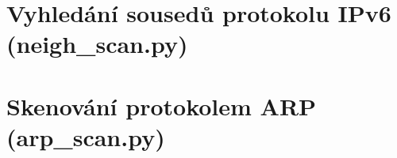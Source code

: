 \section*{Vyhledání sousedů protokolu IPv6 (neigh\_scan.py)}


\section*{Skenování protokolem ARP (arp\_scan.py)}

